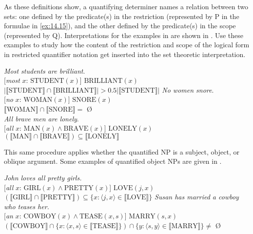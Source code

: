 {As these definitions show, a quantifying determiner names a relation between two sets: one defined by the predicate(s) in the restriction (represented by P in the formulae in \ref{ex:14.15}), and the other defined by the predicate(s) in the scope (represented by Q). Interpretations for the examples in  are shown in . Use these examples to study how the content of the restriction and scope of the logical form in restricted quantifier notation get inserted into the set theoretic interpretation.


\ea \label{ex:14.16}
\ea  \textit{Most students are brilliant}.\\
{}[\textit{most} $x$: $\text{STUDENT}(x)$] $\text{BRILLIANT}(x)$\\
$|\llbracket \text{STUDENT} \rrbracket \cap \llbracket \text{BRILLIANT} \rrbracket | > 0.5 | \llbracket \text{STUDENT} \rrbracket|$
\ex \textit{No women snore}.\\
{}[\textit{no} $x$: $\text{WOMAN}(x)$] $\text{SNORE}(x)$\\
$\llbracket \text{WOMAN} \rrbracket \cap \llbracket \text{SNORE} \rrbracket =$ Ø\\
\ex   \textit{All brave men are lonely}.\\
{}[\textit{all} $x$: $\text{MAN}(x) \wedge \text{BRAVE}(x)$] $\text{LONELY}(x)$\\
$(\llbracket \text{MAN} \rrbracket \cap \llbracket \text{BRAVE} \rrbracket ) \subseteq \llbracket \text{LONELY} \rrbracket$ 
\z \z


This same procedure applies whether the quantified NP is a subject, object, or oblique argument. Some examples of quantified object NPs are given in .


\ea \label{ex:14.17}
\ea \textit{John loves all pretty girls.}\\
{}[\textit{all} $x$: $\text{GIRL}(x) \wedge \text{PRETTY}(x)$] $\text{LOVE}(j,x)$\\
$(\llbracket \text{GIRL} \rrbracket \cap \llbracket \text{PRETTY} \rrbracket) \subseteq  \{x: \langle j,x\rangle  \in \llbracket \text{LOVE} \rrbracket \}$
\ex \textit{Susan has married a cowboy who teases her.}\\
{}[\textit{an} $x$: $\text{COWBOY}(x) \wedge \text{TEASE}(x,s)$] $\text{MARRY}(s,x)$\\
$(\llbracket \text{COWBOY} \rrbracket \cap \{x: \langle x,s \rangle \in  \llbracket \text{TEASE} \rrbracket \}) \cap  \{y: \langle s,y \rangle  \in \llbracket \text{MARRY} \rrbracket  \} \neq$ Ø
\z \z


}
